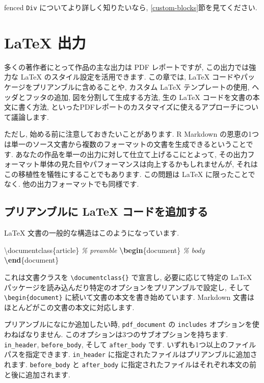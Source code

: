 \documentclass[
  11pt,
  lualatex,
  ja=standard]{bxjsreport}
\newenvironment{Shaded}{\begin{snugshade}}{\end{snugshade}}
\newcommand{\BuiltInTok}[1]{#1}
\newcommand{\CommentTok}[1]{\textcolor[rgb]{0.56,0.35,0.01}{\textit{#1}}}
\newcommand{\ExtensionTok}[1]{#1}
\newcommand{\KeywordTok}[1]{\textcolor[rgb]{0.13,0.29,0.53}{\textbf{#1}}}
\newcommand{\NormalTok}[1]{#1}
\begin{document}
fenced \texttt{Div} についてより詳しく知りたいなら, \ref{custom-blocks}節を見てください.

\hypertarget{latex-output}{%
\chapter{LaTeX 出力}\label{latex-output}}

多くの著作者にとって作品の主な出力は PDF レポートですが, この出力では強力な LaTeX のスタイル設定を活用できます. この章では, LaTeX コードやパッケージをプリアンブルに含めることや, カスタム LaTeX テンプレートの使用, ヘッダとフッタの追加, 図を分割して生成する方法, 生の LaTeX コードを文書の本文に書く方法, といったPDFレポートのカスタマイズに使えるアプローチについて議論します.

ただし, 始める前に注意しておきたいことがあります. R Markdown の恩恵の1つは単一のソース文書から複数のフォーマットの文書を生成できるということです. あなたの作品を単一の出力に対して仕立て上げるこにとよって, その出力フォーマット単体の見た目やパフォーマンスは向上するかもしれませんが, それはこの移植性を犠牲にすることでもあります. この問題は LaTeX に限ったことでなく. 他の出力フォーマットでも同様です.

\hypertarget{latex-preamble}{%
\section{プリアンブルに LaTeX コードを追加する}\label{latex-preamble}}

LaTeX 文書の一般的な構造はこのようになっています.

\begin{Shaded}
\begin{Highlighting}[]
\BuiltInTok{\textbackslash{}documentclass}\NormalTok{\{}\ExtensionTok{article}\NormalTok{\}}
\CommentTok{\% preamble}
\KeywordTok{\textbackslash{}begin}\NormalTok{\{}\ExtensionTok{document}\NormalTok{\}}
\CommentTok{\% body}
\KeywordTok{\textbackslash{}end}\NormalTok{\{}\ExtensionTok{document}\NormalTok{\}}
\end{Highlighting}
\end{Shaded}

これは文書クラスを \texttt{\textbackslash{}documentclass\{\}} で宣言し, 必要に応じて特定の LaTeX パッケージを読み込んだり特定のオプションをプリアンブルで設定し, そして \texttt{\textbackslash{}begin\{document\}} に続いて文書の本文を書き始めています. Markdown 文書はほとんどがこの文書の本文に対応します.

プリアンブルになにか追加したい時, \texttt{pdf\_document} の \texttt{includes} オプションを使わねばなりません. このオプションは3つのサブオプションを持ちます. \texttt{in\_header}, \texttt{before\_body}, そして \texttt{after\_body} です. いずれも1つ以上のファイルパスを指定できます. \texttt{in\_header} に指定されたファイルはプリアンブルに追加されます. \texttt{before\_body} と \texttt{after\_body} に指定されたファイルはそれぞれ本文の前と後に追加されます.
\end{document}
